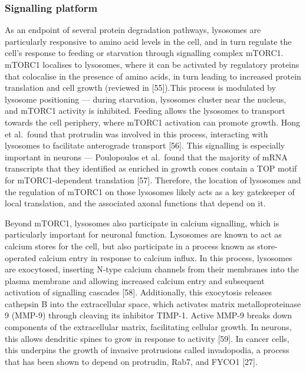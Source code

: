 \documentclass[
  12pt,
  a4paper,
]{book}
\begin{document}
\hypertarget{signalling-platform}{%
\subsubsection{Signalling platform}\label{signalling-platform}}

As an endpoint of several protein degradation pathways, lysosomes are particularly responsive to amino acid levels in the cell, and in turn regulate the cell's response to feeding or starvation through signalling complex mTORC1. mTORC1 localises to lysosomes, where it can be activated by regulatory proteins that colocalise in the presence of amino acids, in turn leading to increased protein translation and cell growth (reviewed in {[}55{]}).This process is modulated by lysosome positioning --- during starvation, lysosomes cluster near the nucleus, and mTORC1 activity is inhibited. Feeding allows the lysosomes to transport towards the cell periphery, where mTORC1 activation can promote growth. Hong et al.~found that protrudin was involved in this process, interacting with lysosomes to facilitate anterograde transport {[}56{]}. This signalling is especially important in neurons --- Poulopoulos et al.~found that the majority of mRNA transcripts that they identified as enriched in growth cones contain a TOP motif for mTORC1-dependent translation {[}57{]}. Therefore, the location of lysosomes and the regulation of mTORC1 on those lysosomes likely acts as a key gatekeeper of local translation, and the associated axonal functions that depend on it.

Beyond mTORC1, lysosomes also participate in calcium signalling, which is particularly important for neuronal function. Lysosomes are known to act as calcium stores for the cell, but also participate in a process known as store-operated calcium entry in response to calcium influx. In this process, lysosomes are exocytosed, inserting N-type calcium channels from their membranes into the plasma membrane and allowing increased calcium entry and subsequent activation of signalling cascades {[}58{]}. Additionally, this exocytosis releases cathepsin B into the extracellular space, which activates matrix metalloproteinase 9 (MMP-9) through cleaving its inhibitor TIMP-1. Active MMP-9 breaks down components of the extracellular matrix, facilitating cellular growth. In neurons, this allows dendritic spines to grow in response to activity {[}59{]}. In cancer cells, this underpins the growth of invasive protrusions called invadopodia, a process that has been shown to depend on protrudin, Rab7, and FYCO1 {[}27{]}.
\end{document}
